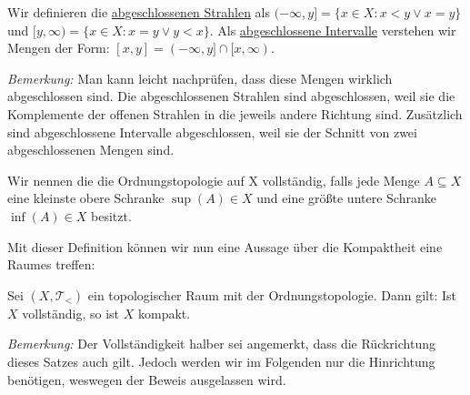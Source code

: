 \documentclass[11pt]{scrartcl}
\begin{document}
\begin{definition}
	Wir definieren die \underline{abgeschlossenen Strahlen} als $(-\infty, y]=\{ x\in X: x < y \lor x = y\}$ und $[y, \infty)=\{ x\in X: x=y \lor y < x\}$. Als \underline{abgeschlossene Intervalle} verstehen wir Mengen der Form: $[x,y]=(-\infty,y]\cap [x,\infty)$.
\end{definition}
\noindent \textit{Bemerkung: } Man kann leicht nachprüfen, dass diese Mengen wirklich abgeschlossen sind. Die abgeschlossenen Strahlen sind abgeschlossen, weil sie die Komplemente der offenen Strahlen in die jeweils andere Richtung sind. Zusätzlich sind abgeschlossene Intervalle abgeschlossen, weil sie der Schnitt von zwei abgeschlossenen Mengen sind.
\begin{definition}
	Wir nennen die die Ordnungstopologie auf X vollständig, falls jede Menge $ A \subseteq X$ eine kleinste obere Schranke $ \sup(A) \in X$ und eine größte untere Schranke $\inf(A) \in X$ besitzt.
\end{definition}
\noindent Mit dieser Definition können wir nun eine Aussage über die Kompaktheit eine Raumes treffen:
\begin{theorem}
	Sei $(X, \mathcal T_{<})$ ein topologischer Raum mit der Ordnungstopologie. Dann gilt: Ist $X$ vollständig, so ist $X$ kompakt.
\end{theorem}
\textit{Bemerkung:} Der Vollständigkeit halber sei angemerkt, dass die Rückrichtung dieses Satzes auch gilt. Jedoch werden wir im Folgenden nur die Hinrichtung benötigen, weswegen der Beweis ausgelassen wird.
\end{document}
